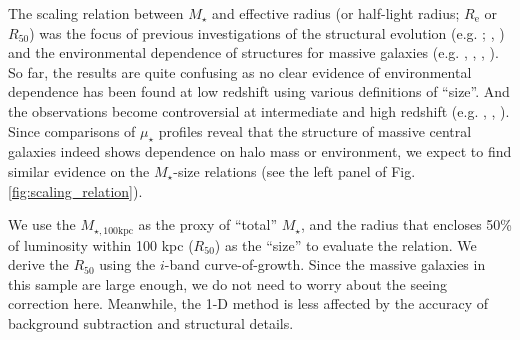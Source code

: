 \documentclass{emulateapj}
\def\mstar{{$M_{\star}$}}
\def\mtot{{$M_{\star,100\mathrm{kpc}}$}}
\def\mden{{$\mu_{\star}$}}
\newcommand{\update}[1]{\textcolor{Bittersweet}{#1}}
\begin{document}
\begin{CJK*}{UTF8}{gbsn}
    The scaling relation between \mstar{} and effective radius (or half-light radius;
    $R_{\mathrm{e}}$ or $R_{\mathrm{50}}$) 
    was the focus of previous investigations of the structural evolution 
    (e.g. \citealt{Shankar2013}; \citealt{Leja2013}, \citealt{vdWel2014}) and 
    the environmental dependence of structures for massive galaxies 
    (e.g. \citealt{Weinmann2009}, \citealt{Nair2010}, \citealt{HCompany13}, 
    \citealt{Cerbrian2014}). 
    So far, the results are quite confusing as no clear evidence of environmental 
    dependence has been found at low redshift using various definitions of ``size''. 
    And the observations become controversial at intermediate and high redshift
    (e.g. \citealt{MCooper2012}, \citealt{Papovich2012}, \citealt{Kelkar2015}).
    \update{
    Since comparisons of \mden{} profiles reveal that the structure of massive central 
    galaxies indeed shows dependence on halo mass or environment, we expect to find 
    similar evidence on the \mstar{}-size relations (see the left panel of 
    Fig.\ref{fig:scaling_relation}).
    }
     
    We use the \mtot{} as the proxy of ``total'' \mstar{}, and the 
    radius that encloses 50\% of luminosity within 100 kpc ($R_{\mathrm{50}}$) as 
    the ``size'' to evaluate the relation.
    \update{
    We derive the $R_{\mathrm{50}}$ using the $i$-band curve-of-growth. 
    Since the massive galaxies in this sample are large enough, we do not need to 
    worry about the seeing correction here. 
    Meanwhile, the 1-D method is less affected by the accuracy of background 
    subtraction and structural details.
    }
    

\end{CJK*}
\end{document}
